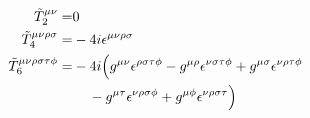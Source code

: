 \documentclass[a4paper]{article}
\newcommand{\pclosed}[1]{\left(#1\right)}
\newcommand{\cclosed}[1]{\left\{#1\right\}}
\newcommand{\trace}[1]{\operatorname{Tr}\cclosed{#1}}
\begin{document}
\begin{multicols}{3}
\begin{align*}
                \tilde{T}_2^{\mu\nu}                     = & 0                                                                                                                                       \\
                \tilde{T}_4^{\mu\nu\rho\sigma}           = & -4i\epsilon^{\mu\nu\rho\sigma}                                                                                                          \\
                \tilde{T}_6^{\mu\nu\rho\sigma\tau\phi}   = & -4i\Big( g^{\mu\nu} \epsilon^{\rho\sigma\tau\phi} - g^{\mu\rho} \epsilon^{\nu\sigma\tau\phi} + g^{\mu\sigma} \epsilon^{\nu\rho\tau\phi} \\
                                                           & \hspace{4mm} - g^{\mu\tau} \epsilon^{\nu\rho\sigma\phi} + g^{\mu\phi} \epsilon^{\nu\rho\sigma\tau} \Big)
            \end{align*}


\end{multicols}
\end{document}
